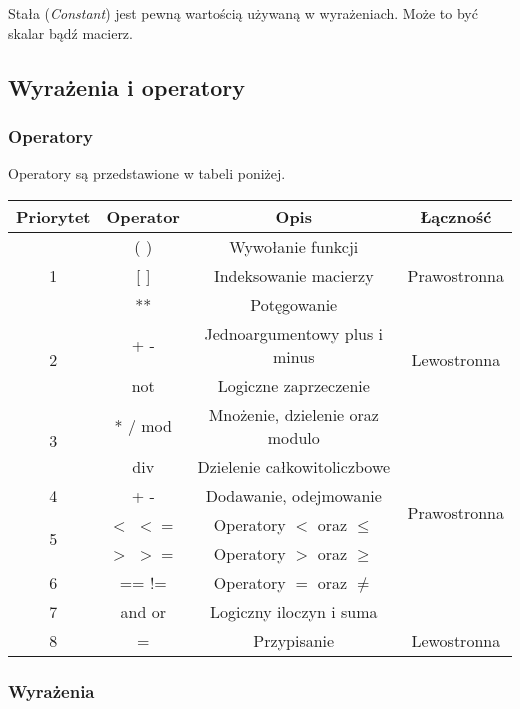 \documentclass[12pt,a4paper]{article}
\begin{document}
Stała (\emph{Constant}) jest pewną wartością używaną w wyrażeniach. Może to być skalar bądź macierz.

\pagebreak

\subsection{Wyrażenia i operatory}

\subsubsection{Operatory}
Operatory są przedstawione w tabeli poniżej.

\begin{table}[ht]
  \centering
  \begin{tabular}{ |c|c|c|c| }
    \hline
    \textbf{Priorytet} & \textbf{Operator} & \textbf{Opis} & \textbf{Łączność} \\ [0.5ex] 
    \hline
    \multirow{3}{*}{1} & ( ) & Wywołanie funkcji & \multirow{3}{*}{Prawostronna} \\
                       & [ ] & Indeksowanie macierzy &  \\
                       & ** & Potęgowanie & \\
    \hline
    \multirow{2}{*}{2} & + - & Jednoargumentowy plus i minus & \multirow{2}{*}{Lewostronna} \\
                       & not & Logiczne zaprzeczenie & \\
    \hline
    \multirow{2}{*}{3} & * / mod & Mnożenie, dzielenie oraz modulo & \multirow{7}{*}{Prawostronna} \\
                       & div & Dzielenie całkowitoliczbowe & \\
    \cline{1-3}
    4 & + - & Dodawanie, odejmowanie & \\ 
    \cline{1-3}
    \multirow{2}{*}{5} & $<$ $<=$ & Operatory $<$ oraz $\leq$ & \\
                       & $>$ $>=$ & Operatory $>$ oraz $\geq$ & \\
    \cline{1-3}
    6 & == != & Operatory $=$ oraz $\neq$ & \\
    \cline{1-3}
    7 & and or & Logiczny iloczyn i suma & \\
    \hline
    8 & = & Przypisanie & Lewostronna \\
    \hline
  \end{tabular}
\end{table}

\subsubsection{Wyrażenia}
\end{document}
